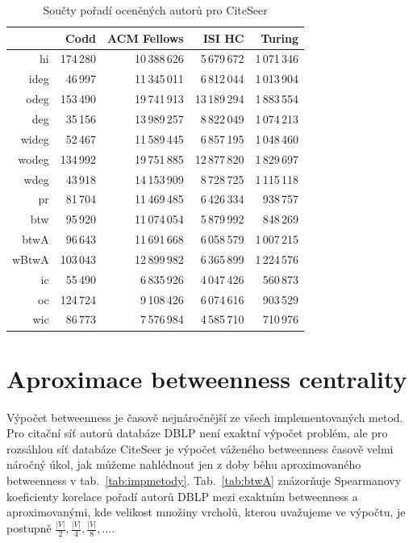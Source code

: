 \documentclass{bakalarka}
\begin{document}
\begin{table}[!ht]
\centering
\caption{Součty pořadí oceněných autorů pro CiteSeer}
\label{tab:oceneni2}
\begin{tabular}{r|rrrr}
\toprule
&Codd & ACM Fellows & ISI HC  & Turing \\
\midrule
hi   &174\,280&10\,388\,626& 5\,679\,672&1\,071\,346 \\
ideg & 46\,997&11\,345\,011& 6\,812\,044&1\,013\,904 \\
odeg &153\,490&19\,741\,913&13\,189\,294&1\,883\,554 \\
deg  & 35\,156&13\,989\,257& 8\,822\,049&1\,074\,213 \\
wideg& 52\,467&11\,589\,445& 6\,857\,195&1\,048\,460 \\
wodeg&134\,992&19\,751\,885&12\,877\,820&1\,829\,697\\
wdeg & 43\,918&14\,153\,909& 8\,728\,725&1\,115\,118\\
pr   & 81\,704&11\,469\,485& 6\,426\,334&   938\,757\\
btw  & 95\,920&11\,074\,054& 5\,879\,992&   848\,269\\
btwA & 96\,643&11\,691\,668& 6\,058\,579&1\,007\,215\\
wBtwA&103\,043&12\,899\,982& 6\,365\,899&1\,224\,576\\
\midrule
ic\footnotemark[1]  &55\,490 &6\,835\,926&4\,047\,426&560\,873\\
oc\footnotemark[1]  &124\,724&9\,108\,426&6\,074\,616&903\,529\\
wic\footnotemark[1] &86\,773 &7\,576\,984&4\,585\,710&710\,976\\
\bottomrule
\end{tabular}
\end{table}


\clearpage
\section{Aproximace betweenness centrality}
Výpočet betweenness je časově nejnáročnější ze všech implementovaných metod.
Pro citační síť autorů databáze DBLP není exaktní výpočet problém, ale pro
rozsáhlou síť databáze CiteSeer je výpočet váženého betweenness časově velmi
náročný úkol, jak můžeme nahlédnout jen z doby běhu aproximovaného betweenness
v tab.~\ref{tab:impmetody}. Tab.~\ref{tab:btwA} znázorňuje Spearmanovy
koeficienty korelace pořadí autorů DBLP mezi exaktním betweenness a
aproximovanými, kde velikost množiny vrcholů, kterou uvažujeme ve výpočtu, je
postupně $\frac{|V|}{2}, \frac{|V|}{4}, \frac{|V|}{8}, \ldots$.
\end{document}
